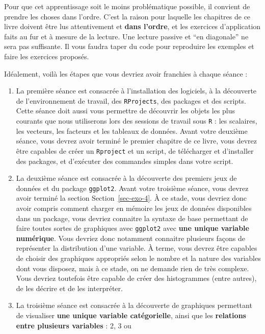 \documentclass[
  a4paper,
  DIV=11,
  numbers=noendperiod,
  oneside]{scrreprt}
\begin{document}
Pour que cet apprentissage soit le moins problématique possible, il
convient de prendre les choses dans l'ordre. C'est la raison pour
laquelle les chapitres de ce livre doivent être lus attentivement et
\textbf{dans l'ordre}, et les exercices d'application faits au fur et à
mesure de la lecture. Une lecture passive et ``en diagonale'' ne sera
pas suffisante. Il vous faudra taper du code pour reproduire les
exemples et faire les exercices proposés.

Idéalement, voilà les étapes que vous devriez avoir franchies à chaque
séance :

\begin{enumerate}
\def\labelenumi{\arabic{enumi}.}
\item
  La première séance est consacrée à l'installation des logiciels, à la
  découverte de l'environnement de travail, des \texttt{RProjects}, des
  packages et des scripts. Cette séance doit aussi vous permettre de
  découvrir les objets les plus courants que nous utiliserons lors des
  sessions de travail sous \texttt{R} : les scalaires, les vecteurs, les
  facteurs et les tableaux de données. Avant votre deuxième séance, vous
  devrez avoir terminé le premier chapitre de ce livre, vous devrez être
  capables de créer un \texttt{Rproject} et un script, de télécharger et
  d'installer des packages, et d'exécuter des commandes simples dans
  votre script.
\item
  La deuxième séance est consacrée à la découverte des premiers jeux de
  données et du package \texttt{ggplot2}. Avant votre troisième séance,
  vous devrez avoir terminé la section Section~\ref{sec-exo-4}. À ce
  stade, vous devriez donc avoir compris comment charger en mémoire les
  jeux de données disponibles dans un package, vous devriez connaitre la
  syntaxe de base permettant de faire toutes sortes de graphiques avec
  \texttt{ggplot2} avec \textbf{une unique variable numérique}. Vous
  devriez donc notamment connaitre plusieurs façons de représenter la
  distribution d'une variable. À terme, vous devrez être capables de
  choisir des graphiques appropriés selon le nombre et la nature des
  variables dont vous disposez, mais à ce stade, on ne demande rien de
  très complexe. Vous devriez toutefois être capable de créer des
  histogrammes (entre autres), de les décrire et de les interpréter.
\item
  La troisième séance est consacrée à la découverte de graphiques
  permettant de visualiser \textbf{une unique variable catégorielle},
  ainsi que les \textbf{relations entre plusieurs variables} : 2, 3 ou

\end{enumerate}
\end{document}
